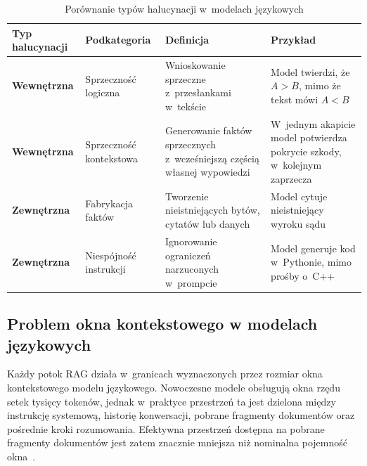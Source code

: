 \begin{table}[H]
  \caption{Porównanie typów halucynacji w~modelach językowych}\label{tab:prownanie-typow-halucynacji-w-modelach-jezykowych}
  \centering
  \small
  \renewcommand{\arraystretch}{1.4}
  \begin{tabularx}{\textwidth}{@{} l l L L @{}}
    \toprule
    \textbf{Typ halucynacji}
     & \textbf{Podkategoria}
     & \textbf{Definicja}
     & \textbf{Przykład}                                          \\
    \midrule
    \textbf{Wewnętrzna}
     & Sprzeczność logiczna
     & Wnioskowanie sprzeczne z~przesłankami w~tekście
     & Model twierdzi, że \(A > B\), mimo że tekst mówi \(A < B\) \\
    \addlinespace
    \textbf{Wewnętrzna}
     & Sprzeczność kontekstowa
     & Generowanie faktów sprzecznych z~wcześniejszą częścią
    własnej wypowiedzi
     & W~jednym akapicie model potwierdza pokrycie szkody,
    w~kolejnym zaprzecza                                          \\
    \addlinespace
    \textbf{Zewnętrzna}
     & Fabrykacja faktów
     & Tworzenie nieistniejących bytów, cytatów lub danych
     & Model cytuje nieistniejący wyroku sądu
    \cite{curlin2025chatgpt}                                      \\
    \addlinespace
    \textbf{Zewnętrzna}
     & Niespójność instrukcji
     & Ignorowanie ograniczeń narzuconych w~prompcie
     & Model generuje kod w~Pythonie, mimo prośby o~C++           \\
    \bottomrule
  \end{tabularx}
\end{table}

\clearpage{}

\subsection{Problem okna kontekstowego w modelach językowych}\label{subsec:problem-okna-kontekstowego}

Każdy potok RAG działa w~granicach wyznaczonych przez rozmiar okna
kontekstowego modelu językowego. Nowoczesne modele obsługują okna rzędu setek
tysięcy tokenów, jednak w~praktyce przestrzeń ta jest dzielona między
instrukcję systemową, historię konwersacji, pobrane fragmenty dokumentów oraz
pośrednie kroki rozumowania. Efektywna przestrzeń dostępna na pobrane fragmenty
dokumentów jest zatem znacznie mniejsza niż nominalna pojemność
okna~\cite{wang2024survey}.

